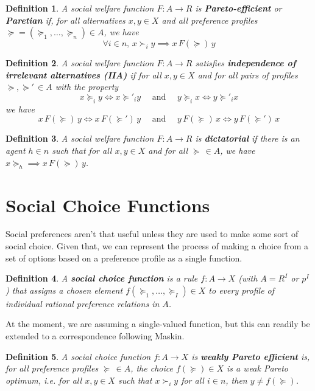 \documentclass[letter, 10pt]{article}
\theoremstyle{basic}
\newtheorem{definition}{Definition}[section]
\begin{document}
\begin{spacing}{1.0}
\begin{definition}
  A social welfare function $F:A\to R$ is
  \textbf{Pareto-efficient} or
  \textbf{Paretian} if, for all alternatives
  $x,y \in X$ and all preference profiles
  $\succeq=(\succeq_1, \ldots, \succeq_n)\in A$, we have \[\forall
  i\in n, \, x \succ_i y \implies x \, F(\succeq) \, y\]
\end{definition}

\begin{definition}
  A social welfare function $F:A\to R$ satisfies
  \textbf{independence of irrelevant alternatives (IIA)}  if for
  all $x,y \in X$ and for all pairs of profiles
  $\succeq , \succeq'\, \in A$ with the property \[x\succeq_i y
  \iff x\succeq'_i y \quad\text{ and }\quad y \succeq_i x \iff y
  \succeq'_i x\] we have \[x\, F(\succeq) \, y \iff x
  \,F(\succeq')\, y \quad\text{ and }\quad y\, F(\succeq) \, x \iff y
  \,F(\succeq')\, x\]
\end{definition}

\begin{definition}
  A social welfare function $F: A\to R$ is
  \textbf{dictatorial} if there is an agent $h\in n$ such
  that for all $x,y \in X$ and for all $\succeq \,\in A$, we
  have $x \succeq_h \implies x\, F(\succeq) \, y$.
\end{definition}

\section{Social Choice Functions}

Social preferences aren't that useful unless they are
used to make some sort of social choice. Given that, we
can represent the process of making a choice from a set
of options based on a preference profile as a single function.

\begin{definition}
  A \textbf{social choice function} is a rule $f: A\to X$
  (with $A = R^I$ or $p^I$) that assigns a chosen element
  $f(\succeq_1, \ldots, \succeq_I) \in X$ to every profile
  of individual rational preference relations in $A$.
\end{definition}

At the moment, we are assuming a single-valued function,
but this can readily be extended to a correspondence following Maskin.

\begin{definition}
  A social choice function $f: A \to X$ is \textbf{weakly
    Pareto efficient} is, for all preference profiles
  $\succeq\, \in A$, the choice $f(\succeq) \in X$ is a
  weak Pareto optimum, i.e. for all $x,y\in X$ such that
  $x \succ_i y$ for all $i\in n$, then $y \not = f(\succeq)$.
\end{definition}


\end{spacing}
\end{document}
